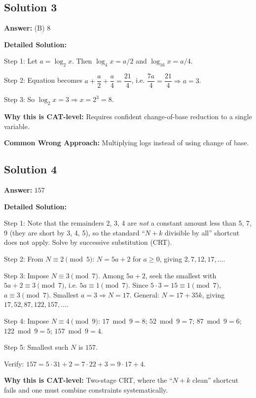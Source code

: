 \documentclass[11pt]{article}
\begin{document}
\subsection*{Solution 3}
\textbf{Answer:} (B) \(8\)

\textbf{Detailed Solution:}

Step 1: Let \(a = \log_2 x\). Then \(\log_4 x = a/2\) and \(\log_{16} x = a/4\).

Step 2: Equation becomes \(a + \dfrac{a}{2} + \dfrac{a}{4} = \dfrac{21}{4}\), i.e. \(\dfrac{7a}{4} = \dfrac{21}{4}\Rightarrow a = 3\).

Step 3: So \(\log_2 x = 3 \Rightarrow x = 2^3 = 8\).

\textbf{Why this is CAT-level:}
Requires confident change-of-base reduction to a single variable.

\textbf{Common Wrong Approach:}
Multiplying logs instead of using change of base.

\subsection*{Solution 4}
\textbf{Answer:} \(157\)

\textbf{Detailed Solution:}

Step 1: Note that the remainders 2, 3, 4 are \emph{not} a constant amount less than 5, 7, 9 (they are short by 3, 4, 5), so the standard ``\(N + k\) divisible by all'' shortcut does not apply. Solve by successive substitution (CRT).

Step 2: From \(N \equiv 2 \pmod 5\): \(N = 5a + 2\) for \(a \ge 0\), giving \(2, 7, 12, 17, \ldots\).

Step 3: Impose \(N \equiv 3 \pmod 7\). Among \(5a+2\), seek the smallest with \(5a+2\equiv 3\pmod7\), i.e. \(5a \equiv 1 \pmod 7\). Since \(5 \cdot 3 = 15 \equiv 1\pmod 7\), \(a \equiv 3 \pmod 7\). Smallest \(a = 3\Rightarrow N = 17\). General: \(N = 17 + 35 k\), giving \(17, 52, 87, 122, 157, \ldots\).

Step 4: Impose \(N \equiv 4 \pmod 9\):
\(17 \bmod 9 = 8\); \(52 \bmod 9 = 7\); \(87 \bmod 9 = 6\); \(122 \bmod 9 = 5\); \(157 \bmod 9 = 4\). \checkmark

Step 5: Smallest such \(N\) is \(\boxed{157}\).

Verify: \(157 = 5\cdot 31 + 2 = 7\cdot 22 + 3 = 9\cdot 17 + 4\). \checkmark

\textbf{Why this is CAT-level:}
Two-stage CRT, where the ``\(N + k\) clean'' shortcut fails and one must combine constraints systematically.
\end{document}
